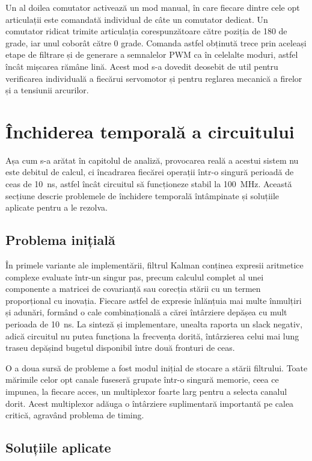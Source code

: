 Un al doilea comutator activează un mod manual, în care fiecare dintre cele opt
articulații este comandată individual de câte un comutator dedicat. Un comutator ridicat
trimite articulația corespunzătoare către poziția de 180 de grade, iar unul coborât către
0 grade. Comanda astfel obținută trece prin aceleași etape de filtrare și de generare a
semnalelor PWM ca în celelalte moduri, astfel încât mișcarea rămâne lină. Acest mod
s-a dovedit deosebit de util pentru verificarea individuală a fiecărui servomotor și
pentru reglarea mecanică a firelor și a tensiunii arcurilor.

\section{Închiderea temporală a circuitului}
\label{sec:proiectare-timing}

Așa cum s-a arătat în capitolul de analiză, provocarea reală a acestui sistem nu
este debitul de calcul, ci încadrarea fiecărei operații într-o singură perioadă de
ceas de 10~ns, astfel încât circuitul să funcționeze stabil la 100~MHz. Această
secțiune descrie problemele de închidere temporală întâmpinate și soluțiile aplicate
pentru a le rezolva.

\subsection{Problema inițială}

În primele variante ale implementării, filtrul Kalman conținea expresii aritmetice
complexe evaluate într-un singur pas, precum calculul complet al unei componente a
matricei de covarianță sau corecția stării cu un termen proporțional cu inovația.
Fiecare astfel de expresie înlănțuia mai multe înmulțiri și adunări, formând o cale
combinațională a cărei întârziere depășea cu mult perioada de 10~ns. La sinteză și
implementare, unealta raporta un slack negativ, adică circuitul nu putea funcționa la
frecvența dorită, întârzierea celui mai lung traseu depășind bugetul disponibil între
două fronturi de ceas.

O a doua sursă de probleme a fost modul inițial de stocare a stării filtrului. Toate
mărimile celor opt canale fuseseră grupate într-o singură memorie, ceea ce impunea, la
fiecare acces, un multiplexor foarte larg pentru a selecta canalul dorit. Acest
multiplexor adăuga o întârziere suplimentară importantă pe calea critică, agravând
problema de timing.

\subsection{Soluțiile aplicate}

